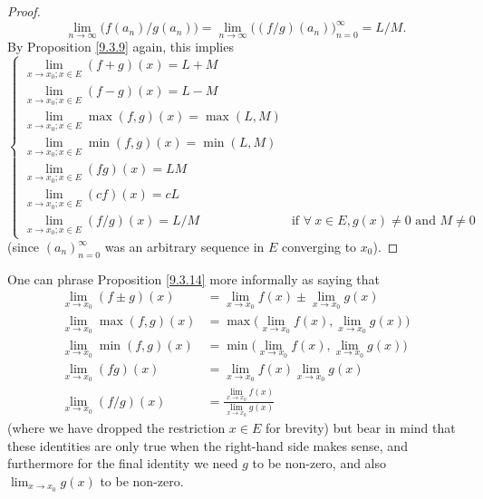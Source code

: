 \begin{proof}
    \[
        \lim_{n \to \infty} \big(f(a_n) / g(a_n)\big) = \lim_{n \to \infty} \big((f / g)(a_n)\big)_{n = 0}^\infty = L / M.
    \]
    By Proposition \ref{9.3.9} again, this implies
    \[
        \begin{cases}
            \lim_{x \to x_0 ; x \in E} (f + g)(x) = L + M                                                                  \\
            \lim_{x \to x_0 ; x \in E} (f - g)(x) = L - M                                                                  \\
            \lim_{x \to x_0 ; x \in E} \max(f, g)(x) = \max(L, M)                                                          \\
            \lim_{x \to x_0 ; x \in E} \min(f, g)(x) = \min(L, M)                                                          \\
            \lim_{x \to x_0 ; x \in E} (fg)(x) = LM                                                                        \\
            \lim_{x \to x_0 ; x \in E} (cf)(x) = cL                                                                        \\
            \lim_{x \to x_0 ; x \in E} (f / g)(x) = L / M & \text{if } \forall\ x \in E, g(x) \neq 0 \text{ and } M \neq 0
        \end{cases}
    \]
    (since \((a_n)_{n = 0}^\infty\) was an arbitrary sequence in \(E\) converging to \(x_0\)).
\end{proof}

\begin{remark}\label{9.3.15}
    One can phrase Proposition \ref{9.3.14} more informally as saying that
    \begin{align*}
        \lim_{x \to x_0} (f \pm g)(x)  & = \lim_{x \to x_0} f(x) \pm \lim_{x \to x_0} g(x)              \\
        \lim_{x \to x_0} \max(f, g)(x) & = \max\bigg(\lim_{x \to x_0} f(x), \lim_{x \to x_0} g(x)\bigg) \\
        \lim_{x \to x_0} \min(f, g)(x) & = \min\bigg(\lim_{x \to x_0} f(x), \lim_{x \to x_0} g(x)\bigg) \\
        \lim_{x \to x_0} (fg)(x)       & = \lim_{x \to x_0} f(x) \lim_{x \to x_0} g(x)                  \\
        \lim_{x \to x_0} (f / g)(x)    & = \frac{\lim_{x \to x_0} f(x)}{\lim_{x \to x_0} g(x)}
    \end{align*}
    (where we have dropped the restriction \(x \in E\) for brevity)
    but bear in mind that these identities are only true when the right-hand side makes sense, and furthermore for the final identity we need \(g\) to be non-zero, and also \(\lim_{x \to x_0} g(x)\) to be non-zero.
\end{remark}

